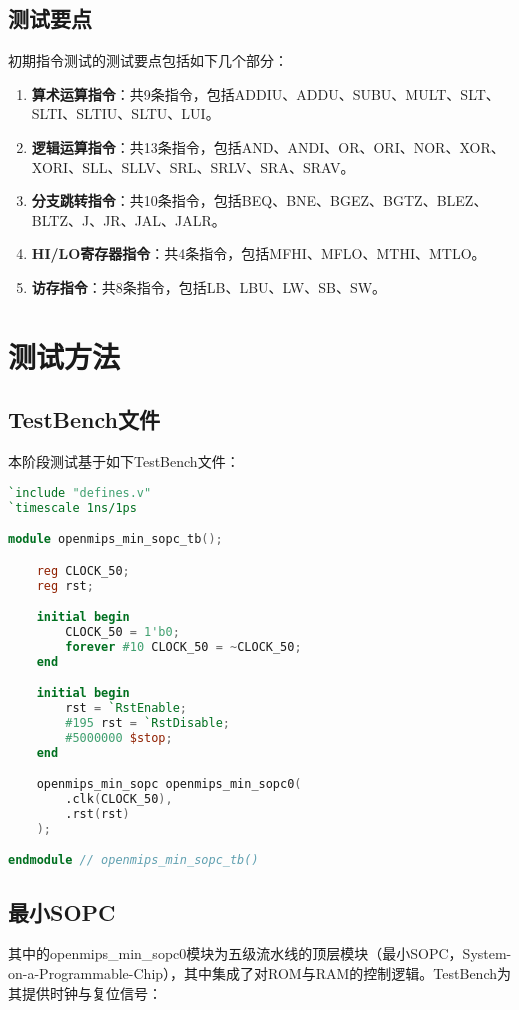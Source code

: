 \subsection{测试要点}

初期指令测试的测试要点包括如下几个部分：

\begin{enumerate}
    \item {\bf 算术运算指令}：共9条指令，包括ADDIU、ADDU、SUBU、MULT、SLT、SLTI、SLTIU、SLTU、LUI。
    \item {\bf 逻辑运算指令}：共13条指令，包括AND、ANDI、OR、ORI、NOR、XOR、XORI、SLL、SLLV、SRL、SRLV、SRA、SRAV。
    \item {\bf 分支跳转指令}：共10条指令，包括BEQ、BNE、BGEZ、BGTZ、BLEZ、BLTZ、J、JR、JAL、JALR。
    \item {\bf HI/LO寄存器指令}：共4条指令，包括MFHI、MFLO、MTHI、MTLO。
    \item {\bf 访存指令}：共8条指令，包括LB、LBU、LW、SB、SW。
\end{enumerate}

\section{测试方法}

\subsection{TestBench文件}
本阶段测试基于如下TestBench文件：

\begin{lstlisting}[language=verilog, caption={TestBench文件}]
`include "defines.v"
`timescale 1ns/1ps

module openmips_min_sopc_tb();

    reg CLOCK_50;
    reg rst;

    initial begin
        CLOCK_50 = 1'b0;
        forever #10 CLOCK_50 = ~CLOCK_50;
    end

    initial begin
        rst = `RstEnable;
        #195 rst = `RstDisable;
        #5000000 $stop;
    end

    openmips_min_sopc openmips_min_sopc0(
        .clk(CLOCK_50),
        .rst(rst)
    );

endmodule // openmips_min_sopc_tb()
\end{lstlisting}

\subsection{最小SOPC}
其中的openmips\_min\_sopc0模块为五级流水线的顶层模块（最小SOPC，System-on-a-Programmable-Chip），其中集成了对ROM与RAM的控制逻辑。TestBench为其提供时钟与复位信号：

